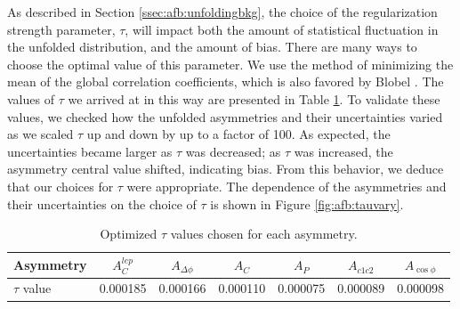 As described in Section \ref{ssec:afb:unfoldingbkg}, the choice of the
regularization strength parameter, $\tau$, will impact both the amount of statistical
fluctuation in the unfolded distribution, and the amount of
bias. There are many ways to choose the optimal value of this parameter. We
use the method of minimizing the mean of the global correlation
coefficients, which is also favored by Blobel
\cite{blobelseminar}. The values of $\tau$ we arrived at in this way
are presented in Table \ref{tab:afb:tau1d}. To validate these values,
we checked how the unfolded asymmetries and their uncertainties varied as we scaled
$\tau$ up and down by up to a factor of 100. As expected, the
uncertainties became larger as $\tau$ was decreased; as $\tau$ was
increased, the asymmetry central value shifted, indicating bias. From
this behavior, we deduce that our choices for $\tau$ were
appropriate. The dependence of the asymmetries and their uncertainties
on the choice of $\tau$ is shown in Figure \ref{fig:afb:tauvary}.

\begin{table}[htb]
\begin{center}
\caption{Optimized $\tau$ values chosen for each asymmetry.}
\label{tab:afb:tau1d}
\begin{tabular}{l | c  c  c  c  c  c }
\hline
Asymmetry & $A^{lep}_{C}$ & $A_{\Delta\phi}$ & $A_{C}$ & $A_{P}$ & $A_{c1c2}$ & $A_{\cos\phi}$ \\ \hline
$\tau$ value & 0.000185 & 0.000166 & 0.000110 & 0.000075 & 0.000089 & 0.000098 \\ \hline
\end{tabular}
\end{center}
\end{table}

